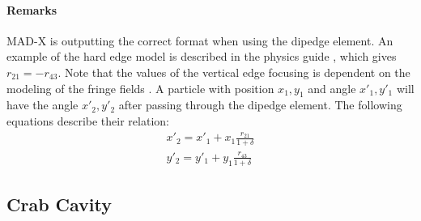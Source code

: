 \paragraph{Remarks}
MAD-X is outputting the correct format when using the dipedge element. An example of  the hard edge model is described in the physics guide \cite{sixphys}, which gives $r_{21} = -r_{43}$.
Note that the values of the vertical edge focusing is dependent on the modeling of the fringe fields \cite{dipedge}.
A particle with position $x_{1},y_1$ and angle $x'_{1},y'_1$ will have the angle $x'_{2},y'_2$ after passing through the dipedge element.
The following equations describe their relation:
\begin{eqnarray}
    x'_{2} = x'_{1} + x_{1}\frac{r_{21}}{1+\delta} \\
    y'_{2} = y'_{1} + y_{1}\frac{r_{43}}{1+\delta}
\end{eqnarray}





\subsection{Crab Cavity} \label{CrabCav}


